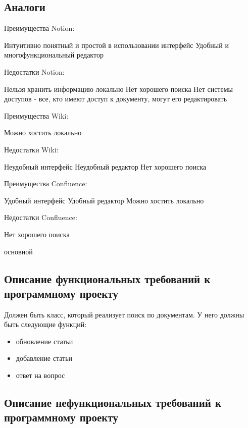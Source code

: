 \subsection{Аналоги}

Преимущества Notion:

Интуитивно понятный и простой в использовании интерфейс
Удобный и многофункциональный редактор

Недостатки Notion:

Нельзя хранить информацию локально
Нет хорошего поиска
Нет системы доступов - все, кто имеют доступ к документу, могут его редактировать

Преимущества Wiki:

Можно хостить локально

Недостатки Wiki:

Неудобный интерфейс 
Неудобный редактор
Нет хорошего поиска


Преимущества Confluence:

Удобный интерфейс 
Удобный редактор 
Можно хостить локально

Недостатки Confluence:

Нет хорошего поиска


основной 
\subsection{Описание функциональных требований к программному проекту}
Должен быть класс, который реализует поиск по документам. У него должны быть следующие функций:
\begin{itemize}
    \item обновление статьи 
    \item добавление статьи
    \item ответ на вопрос
\end{itemize}

\subsection{Описание нефункциональных требований к программному проекту}